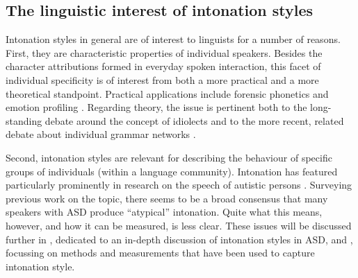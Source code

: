 	\subsection{The linguistic interest of intonation styles}\label{int_back_interest}

Intonation styles in general are of interest to linguists for a number of reasons. First, they are characteristic properties of individual speakers. Besides the character attributions formed in everyday spoken interaction, this facet of individual specificity is of interest from both a more practical and a more theoretical standpoint. Practical applications include forensic phonetics and emotion profiling  \citep{laddEvidenceIndependentFunction1985, mohammadiSpeechPersonalityMapping2012}. Regarding theory, the issue is pertinent both to the long-standing debate around the concept of idiolects \citep{paulPrincipienSprachgeschichte1880} and to the more recent, related debate about individual grammar networks \citep{cangemiListenerspecificPerceptionSpeakerspecific2015}.

Second, intonation styles are relevant for describing the behaviour of specific groups of individuals (within a language community). Intonation has featured particularly prominently in research on the speech of autistic persons \citep[see][]{griceLinguisticProsodyAutism2023,mccannProsodyAutismSpectrum2003a}. Surveying previous work on the topic, there seems to be a broad consensus that many speakers with ASD produce ``atypical'' intonation. Quite what this means, however, and how it can be measured, is less clear. These issues will be discussed further in , dedicated to an in-depth discussion of intonation styles in ASD, and , focussing on methods and measurements that have been used to capture intonation style.

